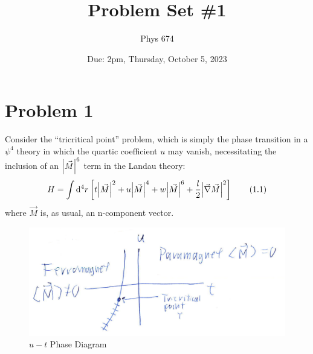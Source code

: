\documentclass[12pt]{article}
\begin{document}
\title{Problem Set \#1}
\author{Phys 674}
\date{Due: 2pm, Thursday, October 5, 2023}
\maketitle

\section*{Problem 1}
Consider the ``tricritical point'' problem, which is simply the phase transition in a $\psi^4$ theory in which the quartic coefficient $u$ may vanish, necessitating the inclusion of an $\abs{\vec{M}}^6$ term in the Landau theory:
\begin{equation}
    H = \int \dd^4 r \left[ t\abs{\vec{M}}^2 + u\abs{\vec{M}}^4 + w\abs{\vec{M}}^6 + \frac{l}{2}\abs{\vec{\nabla}\vec{M}}^2 \right]
    \label{1.1}
    \tag{1.1}
\end{equation}
where $\vec{M}$ is, as usual, an n-component vector.
\begin{figure}[H]
    \includegraphics[scale=.75]{fig1}
    \centering
    \caption{$u-t$ Phase Diagram}
    \label{fig1}
\end{figure}
\end{document}
